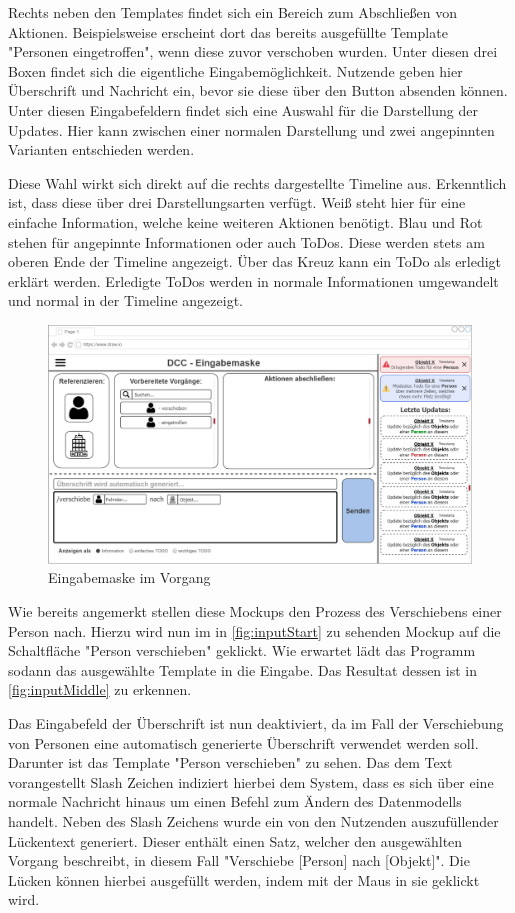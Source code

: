 Rechts neben den Templates findet sich ein Bereich zum Abschließen von Aktionen.
Beispielsweise erscheint dort das bereits ausgefüllte Template "Personen eingetroffen", wenn diese zuvor verschoben wurden.
Unter diesen drei Boxen findet sich die eigentliche Eingabemöglichkeit.
Nutzende geben hier Überschrift und Nachricht ein, bevor sie diese über den Button absenden können.
Unter diesen Eingabefeldern findet sich eine Auswahl für die Darstellung der Updates.
Hier kann zwischen einer normalen Darstellung und zwei angepinnten Varianten entschieden werden.

Diese Wahl wirkt sich direkt auf die rechts dargestellte Timeline aus.
Erkenntlich ist, dass diese über drei Darstellungsarten verfügt.
Weiß steht hier für eine einfache Information, welche keine weiteren Aktionen benötigt.
Blau und Rot stehen für angepinnte Informationen oder auch ToDos. 
Diese werden stets am oberen Ende der Timeline angezeigt.
Über das Kreuz kann ein ToDo als erledigt erklärt werden.
Erledigte ToDos werden in normale Informationen umgewandelt und normal in der Timeline angezeigt.

\begin{figure}[htp]
    \centering
    \includegraphics[width=\textwidth]{images/1-MockupsV1/InputScreenMiddle.jpg}
    \caption{Eingabemaske im Vorgang}
    \label{fig:inputMiddle}
\end{figure}

Wie bereits angemerkt stellen diese Mockups den Prozess des Verschiebens einer Person nach.
Hierzu wird nun im in \autoref{fig:inputStart} zu sehenden Mockup auf die Schaltfläche "Person verschieben" geklickt.
Wie erwartet lädt das Programm sodann das ausgewählte Template in die Eingabe.
Das Resultat dessen ist in \autoref{fig:inputMiddle} zu erkennen.

Das Eingabefeld der Überschrift ist nun deaktiviert, da im Fall der Verschiebung von Personen eine automatisch generierte Überschrift verwendet werden soll.
Darunter ist das Template "Person verschieben" zu sehen.
Das dem Text vorangestellt Slash Zeichen indiziert hierbei dem System, dass es sich über eine normale Nachricht hinaus um einen Befehl zum Ändern des Datenmodells handelt.
Neben des Slash Zeichens wurde ein von den Nutzenden auszufüllender Lückentext generiert.
Dieser enthält einen Satz, welcher den ausgewählten Vorgang beschreibt, in diesem Fall "Verschiebe [Person] nach [Objekt]".
Die Lücken können hierbei ausgefüllt werden, indem mit der Maus in sie geklickt wird.

